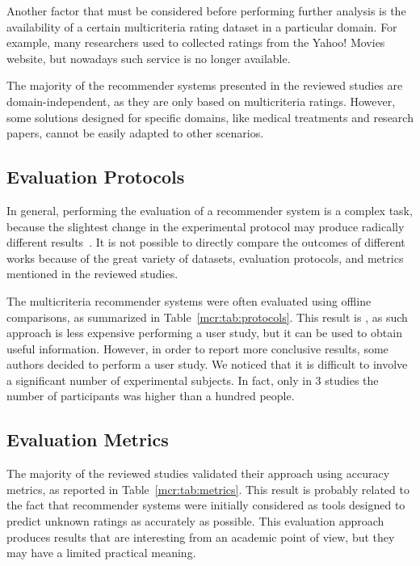 Another factor that must be considered before performing further analysis is the availability of a certain multicriteria rating dataset in a particular domain. For example, many researchers used to collected ratings from the Yahoo! Movies website, but nowadays such service is no longer available.

The majority of the recommender systems presented in the reviewed studies are domain-independent, as they are only based on multicriteria ratings. However, some solutions designed for specific domains, like medical treatments and research papers, cannot be easily adapted to other scenarios.

\subsection{Evaluation Protocols}

In general, performing the evaluation of a recommender system is a complex task, because the slightest change in the experimental protocol may produce radically different results~\cite{Said2014}. It is not possible to directly compare the outcomes of different works because of the great variety of datasets, evaluation protocols, and metrics mentioned in the reviewed studies.

The multicriteria recommender systems were often evaluated using offline comparisons, as summarized in Table~\ref{mcr:tab:protocols}. This result is , as such  approach is less expensive  performing a user study, but it can be used to obtain useful information. However, in order to report more conclusive results, some authors decided to perform a user study. We noticed that it is difficult to involve a significant number of experimental subjects. In fact, only in 3 studies the number of participants was higher than a hundred people.

\subsection{Evaluation Metrics}

The majority of the reviewed studies validated their approach using  accuracy metrics, as reported in Table~\ref{mcr:tab:metrics}. This result is probably related to the fact that recommender systems were initially considered as tools designed to predict unknown ratings as accurately as possible. This evaluation approach produces results that are interesting from an academic point of view, but they may have a limited practical meaning.

